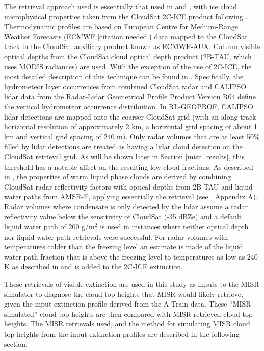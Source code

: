 The retrieval approach used is essentially that used in \cite{mace_and_wrenn_2013} and \cite{berry_and_mace_2014}, with ice cloud microphysical properties taken from the CloudSat 2C-ICE product \citep{deng_et_al_2010, deng_et_al_2013} following \cite{berry_and_mace_2014}. Thermodynamic profiles are based on European Centre for Medium-Range Weather Forecasts (ECMWF [citation needed]) data mapped to the CloudSat track in the CloudSat auxiliary product known as ECMWF-AUX. Column visible optical depths from the CloudSat cloud optical depth product (2B-TAU, which uses MODIS radiances) are used.  With the exception of the use of 2C-ICE, the most detailed description of this technique can be found in \cite{mace_2010}.  Specifically, the hydrometeor layer occurrences from combined CloudSat radar and CALIPSO lidar data from the Radar-Lidar Geometrical Profile Product \citep[RL-GEOPROF;][]{mace_et_al_2009, mace_and_zhang_2014} Version R04 define the vertical hydrometeor occurrence distribution. In RL-GEOPROF, CALIPSO lidar detections are mapped onto the coarser CloudSat grid (with an along track horizontal resolution of approximately 2 km, a horizontal grid spacing of about 1 km and vertical grid spacing of 240 m). Only radar volumes that are at least 50\% filled by lidar detections are treated as having a lidar cloud detection on the CloudSat retrieval grid.  As will be shown later in Section \ref{misr_results}, this threshold has a notable affect on the resulting low-cloud fractions. As described in \cite{mace_2010}, the properties of warm liquid phase clouds are derived by combining CloudSat radar reflectivity factors with optical depths from 2B-TAU and liquid water paths from AMSR-E, applying essentially the \cite{dong_and_mace_2003} retrieval (see \cite{mace_2010}, Appendix A). Radar volumes where condensate is only detected by the lidar assume a radar reflectivity value below the sensitivity of CloudSat (-35 dBZe) and a default liquid water path of 200 g/m$^2 $ is used in instances where neither optical depth nor liquid water path retrievals were successful. For radar volumes with temperatures colder than the freezing level an estimate is made of the liquid water path fraction that is above the freezing level to temperatures as low as 240 K as described in \cite{mace_et_al_2006} and is added to the 2C-ICE extinction. 

These retrievals of visible extinction are used in this study as inputs to the MISR simulator to diagnose the cloud top heights that MISR would likely retrieve, given the input extinction profile derived from the A-Train data. These ``MISR-simulated'' cloud top heights are then compared with MISR-retrieved cloud top heights. The MISR retrievals used, and the method for simulating MISR cloud top heights from the input extinction profiles are described in the following section.

